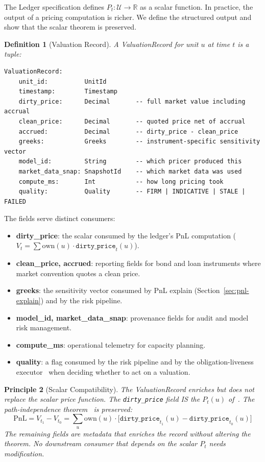 \documentclass[11pt,a4paper]{article}
\newtheorem{definition}{Definition}[section]
\newtheorem{principle}[definition]{Principle}
\begin{document}
The Ledger specification defines $P_t : \mathcal{U} \to \mathbb{R}$ as a scalar function.  In practice, the output of a pricing computation is richer.  We define the structured output and show that the scalar theorem is preserved.

\begin{definition}[Valuation Record]
\label{def:valuation-record}
A \emph{ValuationRecord} for unit $u$ at time $t$ is a tuple:
\begin{lstlisting}
ValuationRecord:
    unit_id:          UnitId
    timestamp:        Timestamp
    dirty_price:      Decimal       -- full market value including accrual
    clean_price:      Decimal       -- quoted price net of accrual
    accrued:          Decimal       -- dirty_price - clean_price
    greeks:           Greeks        -- instrument-specific sensitivity vector
    model_id:         String        -- which pricer produced this
    market_data_snap: SnapshotId    -- which market data was used
    compute_ms:       Int           -- how long pricing took
    quality:          Quality       -- FIRM | INDICATIVE | STALE | FAILED
\end{lstlisting}
\end{definition}

\noindent The fields serve distinct consumers:

\begin{itemize}[nosep]
\item \textbf{dirty\_price}: the scalar consumed by the ledger's PnL computation ($V_t = \sum \mathrm{own}(u) \cdot \texttt{dirty\_price}_t(u)$).
\item \textbf{clean\_price, accrued}: reporting fields for bond and loan instruments where market convention quotes a clean price.
\item \textbf{greeks}: the sensitivity vector consumed by PnL explain (Section~\ref{sec:pnl-explain}) and by the risk pipeline.
\item \textbf{model\_id, market\_data\_snap}: provenance fields for audit and model risk management.
\item \textbf{compute\_ms}: operational telemetry for capacity planning.
\item \textbf{quality}: a flag consumed by the risk pipeline and by the obligation-liveness executor~\cite[\S14.7]{ledger} when deciding whether to act on a valuation.
\end{itemize}

\begin{principle}[Scalar Compatibility]
\label{princ:scalar-compat}
The ValuationRecord enriches but does not replace the scalar price function.  The \texttt{dirty\_price} field IS the $P_t(u)$ of~\cite[\S4.1]{ledger}.  The path-independence theorem~\cite[\S4.3]{ledger} is preserved:
\[
\mathrm{PnL} = V_{t_1} - V_{t_0} = \sum_{u} \mathrm{own}(u) \cdot \bigl[\texttt{dirty\_price}_{t_1}(u) - \texttt{dirty\_price}_{t_0}(u)\bigr]
\]
The remaining fields are metadata that enriches the record without altering the theorem.  No downstream consumer that depends on the scalar $P_t$ needs modification.
\end{principle}
\end{document}
